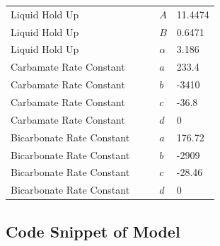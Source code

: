 \documentclass[a4paper,fleqn]{cas-sc}
\begin{document}
\begin{longtable}{lllll}
        Liquid Hold Up            &                &                     & $A$               & 11.4474        \\
        Liquid Hold Up            &                &                     & $B$               & 0.6471         \\
        Liquid Hold Up            &                &                     & $\alpha$          & 3.186          \\
        Carbamate Rate Constant   &                &                     & $a$               & 233.4          \\
        Carbamate Rate Constant   &                &                     & $b$               & -3410          \\
        Carbamate Rate Constant   &                &                     & $c$               & -36.8          \\
        Carbamate Rate Constant   &                &                     & $d$               & 0              \\
        Bicarbonate Rate Constant &                &                     & $a$               & 176.72         \\
        Bicarbonate Rate Constant &                &                     & $b$               & -2909          \\
        Bicarbonate Rate Constant &                &                     & $c$               & -28.46         \\
        Bicarbonate Rate Constant &                &                     & $d$               & 0              \\
        \hline
    \end{longtable}

    \newpage
    \subsection{Code Snippet of Model}
\end{document}
